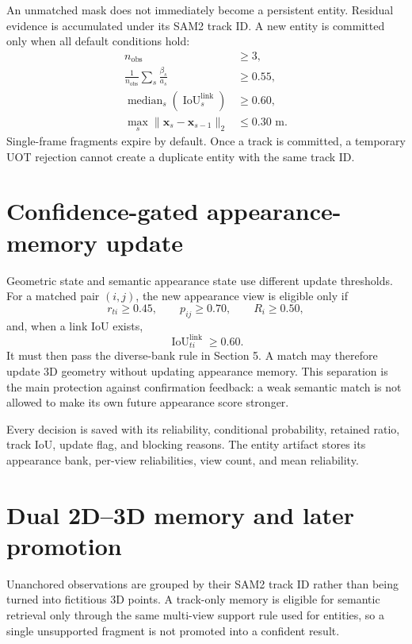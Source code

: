 \documentclass[11pt]{article}
\newcommand{\1}{\bm{1}}
\begin{document}
An unmatched mask does not immediately become a persistent entity. Residual
evidence is accumulated under its SAM2 track ID. A new entity is committed only
when all default conditions hold:
\begin{align}
n_{\mathrm{obs}}&\geq3,\\
\frac{1}{n_{\mathrm{obs}}}\sum_s\frac{\beta_s}{a_s}&\geq0.55,\\
\operatorname{median}_s(\operatorname{IoU}^{\mathrm{link}}_s)&\geq0.60,\\
\max_s\|\bm x_s-\bm x_{s-1}\|_2&\leq0.30\text{ m}.
\end{align}
Single-frame fragments expire by default. Once a track is committed, a temporary
UOT rejection cannot create a duplicate entity with the same track ID.

\section{Confidence-gated appearance-memory update}

Geometric state and semantic appearance state use different update thresholds.
For a matched pair $(i,j)$, the new appearance view is eligible only if
\begin{equation}
r_{ti}\geq0.45,\qquad p_{ij}\geq0.70,\qquad R_i\geq0.50,
\label{eq:memory-gate}
\end{equation}
and, when a link IoU exists,
\begin{equation}
\operatorname{IoU}^{\mathrm{link}}_{ti}\geq0.60.
\end{equation}
It must then pass the diverse-bank rule in Section 5. A match may therefore
update 3D geometry without updating appearance memory. This separation is the
main protection against confirmation feedback: a weak semantic match is not
allowed to make its own future appearance score stronger.

Every decision is saved with its reliability, conditional probability, retained
ratio, track IoU, update flag, and blocking reasons. The entity artifact stores
its appearance bank, per-view reliabilities, view count, and mean reliability.

\section{Dual 2D--3D memory and later promotion}

Unanchored observations are grouped by their SAM2 track ID rather than being
turned into fictitious 3D points. A track-only memory is eligible for semantic
retrieval only through the same multi-view support rule used for entities, so a
single unsupported fragment is not promoted into a confident result.
\end{document}
